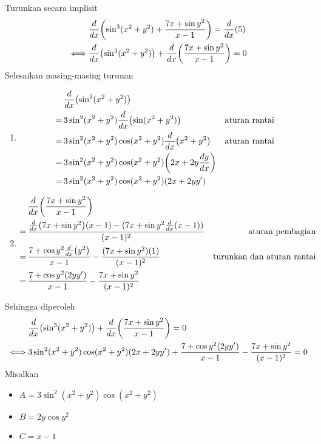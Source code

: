 \begin{enumerate}[leftmargin=*, label={\arabic*}.]
\begin{enumerate}[label={\alph*}.]
    Turunkan secara implisit 
    \begin{align*}
        &\drv{x}{\sin^{3}(x^2+y^2)+\frac{7x+\sin y^{2}}{x-1}}=\drv{x}{5}\\
        \iff &\drv{x}{\sin^{3}(x^2+y^2)}+\drv{x}{\frac{7x+\sin y^{2}}{x-1}} = 0
    \end{align*}
    Selesaikan masing-masing turunan
    \begin{enumerate}[label={\arabic*})]
        \item \begin{align*}
        &\drv{x}{\sin^{3}(x^2+y^2)}\\
        =\,&3\sin^{2}(x^{2}+y^{2})\drv{x}{\sin(x^{2}+y^{2})}
        &\text{aturan rantai}\\
        =\,&3\sin^{2}(x^{2}+y^{2})\cos(x^{2}+y^{2})\drv{x}{x^{2}+y^{2}}
        &\text{aturan rantai}\\
        =\,&3\sin^{2}(x^{2}+y^{2})\cos(x^{2}+y^{2})\bracket*{2x+2y\frac{dy}{dx}}\\
        =\,&3\sin^{2}(x^{2}+y^{2})\cos(x^{2}+y^{2})(2x+2yy')
        \end{align*}
        \item \begin{align*}
            &\drv{x}{\frac{7x+\sin y^{2}}{x-1}} \\
            =\,&\frac{\drv{x}{7x+\sin y^{2}}(x-1)-(7x+\sin y^{2}\drv{x}{x-1})}{(x-1)^{2}}
            &\text{aturan pembagian}\\
            =\,& \frac{7+\cos y^{2}\drv{x}{y^{2}}}{x-1}-\frac{(7x+\sin y^{2})(1)}{(x-1)^{2}}
            &\text{turunkan dan aturan rantai}\\
            =\,&\frac{7+\cos y^{2}(2yy')}{x-1}-\frac{7x+\sin y^{2}}{(x-1)^{2}}
        \end{align*}
    \end{enumerate}
    Sehingga diperoleh 
    \begin{align*}
        &\drv{x}{\sin^{3}(x^2+y^2)}+\drv{x}{\frac{7x+\sin y^{2}}{x-1}} = 0\\
        \iff &3\sin^{2}(x^{2}+y^{2})\cos(x^{2}+y^{2})(2x+2yy') + 
        \frac{7+\cos y^{2}(2yy')}{x-1}-\frac{7x+\sin y^{2}}{(x-1)^{2}} = 0
    \end{align*}
    Misalkan 
    \begin{itemize}
        \item $A = 3\sin^{2}(x^{2}+y^{2})\cos(x^{2}+y^{2})$
        \item $B = 2y\cos y^{2}$
        \item $C = x-1$

\end{itemize}
\end{enumerate}
\end{enumerate}
